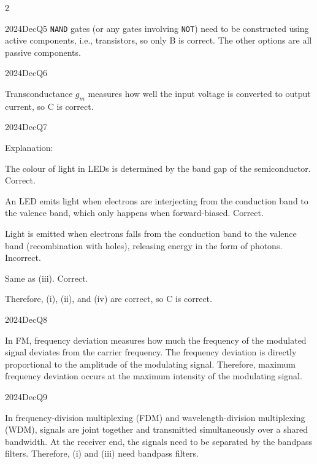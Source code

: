\begin{multicols}{2}
\begin{qsolution}{2024}{Dec}{Q5}{\tgElectronics \tgElectronicsBJT}
    \texttt{NAND} gates (or any gates involving \texttt{NOT}) need to be constructed using active components, i.e., transistors, so only B is correct.
    The other options are all passive components.
\end{qsolution}

\begin{qsolution}{2024}{Dec}{Q6}{\tgElectronics \tgElectronicsSemiconductor}
    
    Transconductance $g_m$ measures how well the input voltage is converted to output current, so C is correct.
\end{qsolution}

\begin{qsolution}{2024}{Dec}{Q7}{\tgElectronics \tgElectronicsOptoelectronics}

    Explanation:
    \begin{enumroman}
        \item The colour of light in LEDs is determined by the band gap of the semiconductor. Correct.
        \item An LED emits light when electrons are interjecting from the conduction band to the valence band, which only happens when forward-biased. Correct.
        \item Light is emitted when electrons falls from the conduction band to the valence band (recombination with holes), releasing energy in the form of photons. Incorrect.
        \item Same as (iii). Correct.
    \end{enumroman}
    Therefore, (i), (ii), and (iv) are correct, so C is correct.
\end{qsolution}

\begin{qsolution}{2024}{Dec}{Q8}{\tgElectronics \tgElectronicsFM}

    In FM, frequency deviation measures how much the frequency of the modulated signal deviates from the carrier frequency.
    The frequency deviation is directly proportional to the amplitude of the modulating signal.
    Therefore, maximum frequency deviation occurs at the maximum intensity of the modulating signal.
\end{qsolution}

\begin{qsolution}{2024}{Dec}{Q9}{\tgElectronics \tgElectronicsMultiplexing}

    In frequency-division multiplexing (FDM) and wavelength-division multiplexing (WDM), signals are joint together and transmitted simultaneously over a shared bandwidth.
    At the receiver end, the signals need to be separated by the bandpass filters.
    Therefore, (i) and (iii) need bandpass filters.


\end{qsolution}
\end{multicols}
